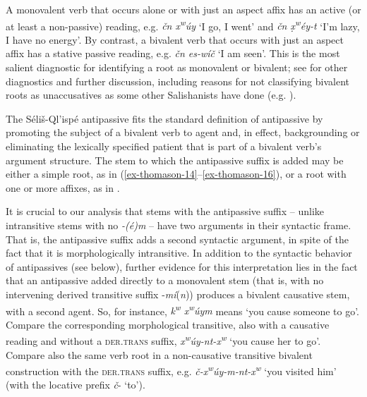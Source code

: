 \documentclass[output=paper,colorlinks,citecolor=brown]{langscibook}
\begin{document}
A monovalent verb that occurs alone or with just an aspect affix has
an active (or at least a non-passive) reading, e.g. \emph{\v{c}n
 x\textsuperscript w\'uy} `I go, I went' and \emph{\v{c}n
 \d{x}\textsuperscript w\'ey-t} `I'm lazy, I have no energy'.  By
contrast, a bivalent verb that occurs with just an aspect affix has a
stative passive reading, e.g. \emph{\v{c}n es-w\'i\v{c}} `I am seen'.
This is the most salient diagnostic for identifying a root as
monovalent or bivalent; see  for other diagnostics
and further discussion, including reasons for not classifying bivalent
roots as unaccusatives as some other Salishanists have done
(e.g. \citealt{Gerdts:1991}).


The S\'eli\v{s}-Ql'isp\'e antipassive fits the standard definition of
antipassive by promoting the subject of a bivalent verb to agent and,
in effect, backgrounding or eliminating the lexically specified
patient that is part of a bivalent verb's argument structure.  The
stem to which the antipassive suffix is added may be either a simple
root, as in (\ref{ex-thomason-14}--\ref{ex-thomason-16}), 
or a root with one or more affixes, as in .


It is crucial to our analysis that stems with the antipassive
suffix -- unlike intransitive stems with no \emph{-(\'e)m} -- have two
arguments in their syntactic frame.  That is, the antipassive suffix
adds a second syntactic argument, in spite of the fact that it is
morphologically intransitive.  In addition to the syntactic behavior
of antipassives (see below), further evidence for this interpretation
lies in the fact that an antipassive added directly to a monovalent
stem (that is, with no intervening derived transitive suffix -\emph{m\'i}(\emph{n})) produces a bivalent causative stem, with a second
agent.  So, for instance, \emph{{k\textsuperscript w} x\textsuperscript
 w\'uym} means `you cause someone to go'.  Compare the corresponding
morphological transitive, also with a causative reading and without a
\textsc{der.trans} suffix, \emph{x\textsuperscript
 w\'uy-nt-x\textsuperscript w} `you cause her to go'.  Compare also the
same verb root in a non-causative transitive bivalent construction
with the \textsc{der.trans} suffix, e.g. \emph{\v{c}-x\textsuperscript
 w\'uy-m-nt-x\textsuperscript w} `you visited him' (with the locative
prefix \emph{\v{c}}- `to').
\end{document}
